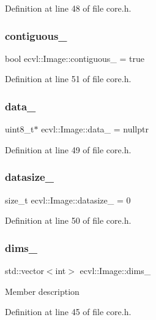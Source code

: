 Definition at line 48 of file core.\+h.

\mbox{\label{classecvl_1_1_image_a709cf6785d9340859f9e8dba1f950f7a}} 
\subsubsection{contiguous\_}
{\footnotesize\ttfamily bool ecvl\+::\+Image\+::contiguous\+\_\+ = true}



Definition at line 51 of file core.\+h.

\mbox{\label{classecvl_1_1_image_ac3bdae3b8e7b4b02fa137f4a4c900cc2}} 
\subsubsection{data\_}
{\footnotesize\ttfamily uint8\+\_\+t$\ast$ ecvl\+::\+Image\+::data\+\_\+ = nullptr}



Definition at line 49 of file core.\+h.

\mbox{\label{classecvl_1_1_image_a1855a32639c8385ba96f9e151ca882d2}} 
\subsubsection{datasize\_}
{\footnotesize\ttfamily size\+\_\+t ecvl\+::\+Image\+::datasize\+\_\+ = 0}



Definition at line 50 of file core.\+h.

\mbox{\label{classecvl_1_1_image_af26f5a4e644cef20597bd084bcddf1d0}} 
\subsubsection{dims\_}
{\footnotesize\ttfamily std\+::vector$<$int$>$ ecvl\+::\+Image\+::dims\+\_\+}

Member description 

Definition at line 45 of file core.\+h.

\mbox{\label{classecvl_1_1_image_a45a4b6379cc953438867ec2753a65648}} 
